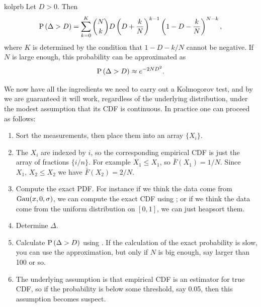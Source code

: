 \begin{theorem}{}{kolprb}
  Let $D>0$. Then
  $$
    \operatorname{P}\left(\Delta>D\right)=\sum_{k=0}^K{N\choose k}D\left(D+\frac{k}{N}\right)^{k-1}
                   \left(1-D-\frac{k}{N}\right)^{N-k},
  $$
  where $K$ is determined by the condition that $1-D-k/N$ cannot be
  negative. If $N$ is large enough, this probability can be approximated as
  $$
    \operatorname{P}\left(\Delta>D\right)\approx e^{-2ND^2}.
  $$
\end{theorem}

We now have all the ingredients we need to carry out a Kolmogorov test,
and by  we are guaranteed it will work, regardless
of the underlying distribution, under the modest assumption that its
CDF is continuous. In practice one can proceed as follows:
\begin{enumerate}
  \item Sort the measurements, then place them into an array $\{X_i\}$.
  \item The $X_i$ are indexed by $i$, so the corresponding empirical CDF 
        is just the array of fractions $\{i/n\}$. For example $X_1\leq X_1$, 
        so $\bar{F}(X_1)=1/N$. Since $X_1,\,X_2\leq X_2$ we have 
        $\bar{F}(X_2)=2/N$.
  \item Compute the exact PDF. For instance if we think the
        data come from $\operatorname{Gau}(x,0,\sigma)$, we can compute the exact CDF
        using ; or if we think the data come from the 
        uniform distribution on $[0,1]$, we can just heapsort them.
  \item Determine $\Delta$.
  \item Calculate $\operatorname{P}\left(\Delta>D\right)$ using .
        If the calculation of the exact probability is slow, you can
        use the approximation, but only if $N$ is big enough, say larger
        than 100 or so.
  \item The underlying assumption is that empirical CDF is an estimator
        for true CDF, so if the probability is below some threshold,
        say 0.05, then this assumption becomes suspect. 
\end{enumerate}


